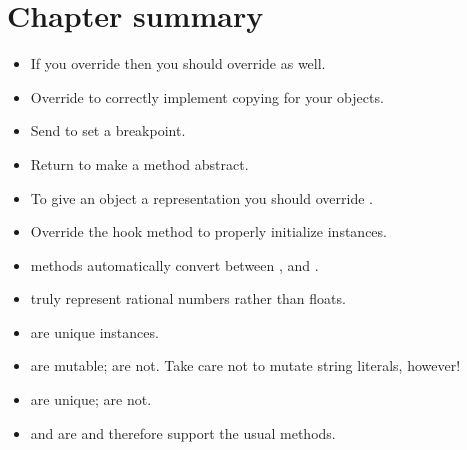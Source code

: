 \documentclass[a4paper,10pt,twoside]{book}
\begin{document}

\section{Chapter summary}

\begin{itemize}

  \item If you override \ct{=} then you should override  as well.

  \item Override  to correctly implement copying for your objects.

  \item Send  to set a breakpoint.

  \item Return  to make a method abstract.

  \item To give an object a  representation you should override .

  \item Override the hook method  to properly initialize instances.

  \item {} methods automatically convert between ,  and .

  \item {} truly represent rational numbers rather than floats.

  \item {} are unique instances.

  \item {} are mutable;  are not.
  Take care not to mutate string literals, however!

  \item {} are unique;  are not.

  \item {} and  are  and therefore support the usual  methods.

\end{itemize}

\ifx\wholebook\relax\else
   
   
\end{document}
